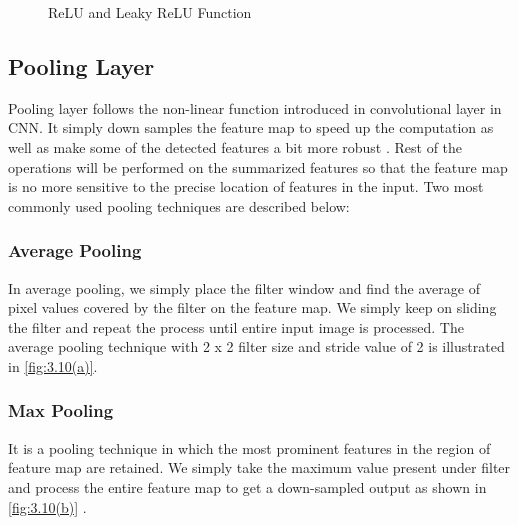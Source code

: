 
\begin{figure}%
    \centering
    \qquad
    \caption{ReLU and Leaky ReLU Function}%
    \label{fig:3.9}%
\end{figure}

\subsection{Pooling Layer}
Pooling layer follows the non-linear function introduced in convolutional layer 
in CNN. It simply down samples the feature map to 
speed up the computation as well as make some of the detected features a bit more robust \cite{chap_3_article:4}. Rest of the operations will be performed on the summarized features so that the feature map is no more sensitive to the
 precise location of features in the input. Two most 
commonly used pooling techniques are described below:

\subsubsection{Average Pooling}

In average pooling, we simply place the filter window and 
find the average of pixel values covered by the filter on 
the feature map. We simply keep on sliding the filter and repeat 
the process until entire input image is processed. The average pooling 
technique with 2 x 2 filter size and 
stride value of 2 is illustrated in \ref{fig:3.10(a)}.

\subsubsection{Max Pooling}
It is a pooling technique in which the most prominent 
features in the region of feature map are retained. We simply 
take the maximum value present under filter and process the entire 
feature map to get a down-sampled output as shown in \ref{fig:3.10(b)} \cite{chap_3_article:6}.


